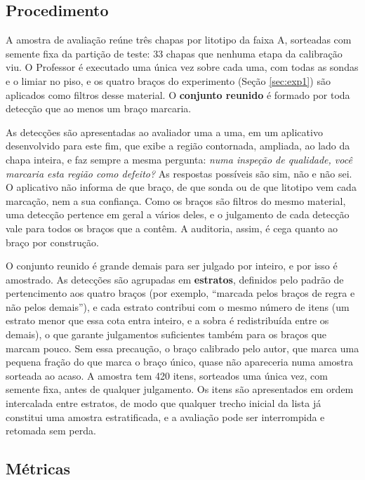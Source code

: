 \subsection{Procedimento}

A amostra de avaliação reúne três chapas por litotipo da faixa A, sorteadas com semente fixa da partição de teste: 33 chapas que nenhuma etapa da calibração viu. O Professor é executado uma única vez sobre cada uma, com todas as sondas e o limiar no piso, e os quatro braços do experimento (Seção \ref{sec:exp1}) são aplicados como filtros desse material. O \textbf{conjunto reunido} é formado por toda detecção que ao menos um braço marcaria.

As detecções são apresentadas ao avaliador uma a uma, em um aplicativo desenvolvido para este fim, que exibe a região contornada, ampliada, ao lado da chapa inteira, e faz sempre a mesma pergunta: \textit{numa inspeção de qualidade, você marcaria esta região como defeito?} As respostas possíveis são sim, não e não sei. O aplicativo não informa de que braço, de que sonda ou de que litotipo vem cada marcação, nem a sua confiança. Como os braços são filtros do mesmo material, uma detecção pertence em geral a vários deles, e o julgamento de cada detecção vale para todos os braços que a contêm. A auditoria, assim, é cega quanto ao braço por construção.

O conjunto reunido é grande demais para ser julgado por inteiro, e por isso é amostrado. As detecções são agrupadas em \textbf{estratos}, definidos pelo padrão de pertencimento aos quatro braços (por exemplo, ``marcada pelos braços de regra e não pelos demais''), e cada estrato contribui com o mesmo número de itens (um estrato menor que essa cota entra inteiro, e a sobra é redistribuída entre os demais), o que garante julgamentos suficientes também para os braços que marcam pouco. Sem essa precaução, o braço calibrado pelo autor, que marca uma pequena fração do que marca o braço único, quase não apareceria numa amostra sorteada ao acaso. A amostra tem 420 itens, sorteados uma única vez, com semente fixa, antes de qualquer julgamento. Os itens são apresentados em ordem intercalada entre estratos, de modo que qualquer trecho inicial da lista já constitui uma amostra estratificada, e a avaliação pode ser interrompida e retomada sem perda.

\subsection{Métricas}

